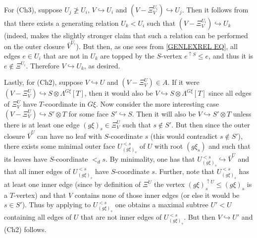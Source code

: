 \documentclass[a4paper,10pt
,draft
]{article}%
\begin{document}
\begin{example}
For (Ch3), suppose $U_j \not \geq U_i$, 
$V \hookrightarrow U_i$ and
$(V - \Xi^{U_i}_V) \hookrightarrow U_j$.
Then it follows from \cite[Lemma 7.37]{Per17}
that there exists a generating relation $U_k < U_i$
such that $(V - \Xi^{U_i}_V) \hookrightarrow U_k$
(indeed, \cite[Lemma 7.37]{Per17} makes the slightly stronger claim that such a relation can be performed on the outer closure $\bar{V}^{U_i}$). But then, as one sees from \eqref{GENLEXREL EQ},
all edges $e \in U_i$ that are not in $U_k$ are topped by the $S$-vertex $e^{\uparrow S}\leq e$, and thus it is $e \not \in \Xi^{U_i}$. Therefore $V \hookrightarrow U_k$, as desired.

Lastly, for (Ch2), suppose $V \hookrightarrow U$ and 
$(V - \Xi^{U}_V) \in A$.
If it were 
$(V-\Xi^{U}_V) \hookrightarrow S \otimes \Lambda^{G \xi}[T]$, then it would also be 
$V \hookrightarrow S \otimes \Lambda^{G \xi}[T]$
since all edges of $\Xi^{U}_V$ have 
$T$-coordinate in $G\xi$.
Now consider the more interesting case
$(V - \Xi^{U}_V) \hookrightarrow S' \otimes T$
for some face $S' \hookrightarrow S$.
Then it will also be 
$V \hookrightarrow S' \otimes T$
unless there is at least one edge
$(g \xi)_s \in \Xi^{U}_V$ such that $s \not \in S'$.
But then since the outer closure $\bar{V}^U$ can have no leaf with $S$-coordinate $s$ (this would contradict $s \not \in S'$),
there exists some minimal outer face $U_{(g\xi)_s}^{<s}$ of $U$ with root $(g\xi_s)$ and such that its leaves have $S$-coordinate $<_d s$.
By minimality, one has that $U_{(g\xi)_s}^{<s} \hookrightarrow \bar{V}^U$ and that all inner edges of $U_{(g\xi)_s}^{<s}$ have
$S$-coordinate $s$.
Further, note that $U_{(g\xi)_s}^{<s}$
has at least one inner edge
(since by definition of $\Xi^U$ the vertex 
$(g \xi)_s^{\uparrow U} \leq (g \xi)_s$ is a $T$-vertex)
and that $V$ contains none of those inner edges (or else it would be $s \in S'$).
Thus by applying \cite[Lemma 7.34]{Per17}
to $U_{(g\xi)_s}^{<s}$ one obtains a maximal subtree $U' < U$
containing all edges of $U$ that are not inner edges of $U_{(g\xi)_s}^{<s}$.
But then $V \hookrightarrow U'$ and (Ch2) follows.
\end{example}
\end{document}
